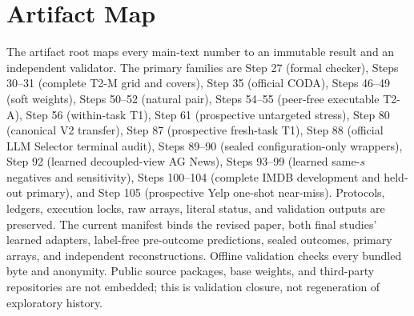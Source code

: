 

\section{Artifact Map}

The artifact root maps every main-text number to an immutable result and an independent validator. The primary families are Step 27 (formal checker), Steps 30--31 (complete T2-M grid and covers), Step 35 (official CODA), Steps 46--49 (soft weights), Steps 50--52 (natural pair), Steps 54--55 (peer-free executable T2-A), Step 56 (within-task T1), Step 61 (prospective untargeted stress), Step 80 (canonical V2 transfer), Step 87 (prospective fresh-task T1), Step 88 (official LLM Selector terminal audit), Steps 89--90 (sealed configuration-only wrappers), Step 92 (learned decoupled-view AG News), Steps 93--99 (learned same-$s$ negatives and sensitivity), Steps 100--104 (complete IMDB development and held-out primary), and Step 105 (prospective Yelp one-shot near-miss). Protocols, ledgers, execution locks, raw arrays, literal status, and validation outputs are preserved. The current manifest binds the revised paper, both final studies' learned adapters, label-free pre-outcome predictions, sealed outcomes, primary arrays, and independent reconstructions. Offline validation checks every bundled byte and anonymity. Public source packages, base weights, and third-party repositories are not embedded; this is validation closure, not regeneration of exploratory history.
